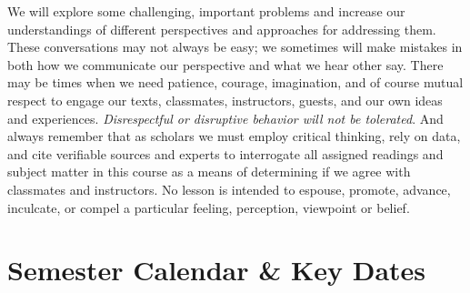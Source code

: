\documentclass[
  10pt,
  letterpaper,
  oneside,
  open=any]{scrbook}
\begin{document}
\begin{tcolorbox}[enhanced jigsaw, toptitle=1mm, arc=.35mm, opacitybacktitle=0.6, colbacktitle=quarto-callout-tip-color!10!white, titlerule=0mm, colback=white, opacityback=0, colframe=quarto-callout-tip-color-frame, coltitle=black, left=2mm, toprule=.15mm, title=\textcolor{quarto-callout-tip-color}{\faLightbulb}\hspace{0.5em}{Important note regarding class discussions and group work.}, breakable, leftrule=.75mm, bottomtitle=1mm, rightrule=.15mm, bottomrule=.15mm]

We will explore some challenging, important problems and increase our
understandings of different perspectives and approaches for addressing
them. These conversations may not always be easy; we sometimes will make
mistakes in both how we communicate our perspective and what we hear
other say. There may be times when we need patience, courage,
imagination, and of course mutual respect to engage our texts,
classmates, instructors, guests, and our own ideas and experiences.
\emph{Disrespectful or disruptive behavior will not be tolerated}. And
always remember that as scholars we must employ critical thinking, rely
on data, and cite verifiable sources and experts to interrogate all
assigned readings and subject matter in this course as a means of
determining if we agree with classmates and instructors. No lesson is
intended to espouse, promote, advance, inculcate, or compel a particular
feeling, perception, viewpoint or belief.

\end{tcolorbox}


\chapter{Semester Calendar \& Key
Dates}\label{semester-calendar-key-dates}

\begingroup\fontsize{9}{11}\selectfont
\end{document}
